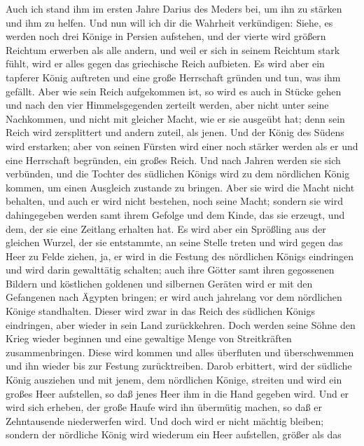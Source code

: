  Auch ich stand ihm im ersten Jahre
Darius\textquotesingle{} des Meders bei, um ihn zu stärken und ihm zu
helfen.  Und nun will ich dir die Wahrheit verkündigen:
Siehe, es werden noch drei Könige in Persien aufstehen, und der vierte
wird größern Reichtum erwerben als alle andern, und weil er sich in
seinem Reichtum stark fühlt, wird er alles gegen das griechische Reich
aufbieten.  Es wird aber ein tapferer König auftreten und
eine große Herrschaft gründen und tun, was ihm gefällt. 
Aber wie sein Reich aufgekommen ist, so wird es auch in Stücke gehen und
nach den vier Himmelsgegenden zerteilt werden, aber nicht unter seine
Nachkommen, und nicht mit gleicher Macht, wie er sie ausgeübt hat; denn
sein Reich wird zersplittert und andern zuteil, als jenen.
 Und der König des Südens wird erstarken; aber von seinen
Fürsten wird einer noch stärker werden als er und eine Herrschaft
begründen, ein großes Reich.  Und nach Jahren werden sie
sich verbünden, und die Tochter des südlichen Königs wird zu dem
nördlichen König kommen, um einen Ausgleich zustande zu bringen. Aber
sie wird die Macht nicht behalten, und auch er wird nicht bestehen, noch
seine Macht; sondern sie wird dahingegeben werden samt ihrem Gefolge und
dem Kinde, das sie erzeugt, und dem, der sie eine Zeitlang erhalten hat.
 Es wird aber ein Sprößling aus der gleichen Wurzel, der
sie entstammte, an seine Stelle treten und wird gegen das Heer zu Felde
ziehen, ja, er wird in die Festung des nördlichen Königs eindringen und
wird darin gewalttätig schalten;  auch ihre Götter samt
ihren gegossenen Bildern und köstlichen goldenen und silbernen Geräten
wird er mit den Gefangenen nach Ägypten bringen; er wird auch jahrelang
vor dem nördlichen Könige standhalten.  Dieser wird zwar
in das Reich des südlichen Königs eindringen, aber wieder in sein Land
zurückkehren.  Doch werden seine Söhne den Krieg wieder
beginnen und eine gewaltige Menge von Streitkräften zusammenbringen.
Diese wird kommen und alles überfluten und überschwemmen und ihn wieder
bis zur Festung zurücktreiben.  Darob erbittert, wird der
südliche König ausziehen und mit jenem, dem nördlichen Könige, streiten
und wird ein großes Heer aufstellen, so daß jenes Heer ihm in die Hand
gegeben wird.  Und er wird sich erheben, der große Haufe
wird ihn übermütig machen, so daß er Zehntausende niederwerfen wird. Und
doch wird er nicht mächtig bleiben;  sondern der
nördliche König wird wiederum ein Heer aufstellen, größer als das
